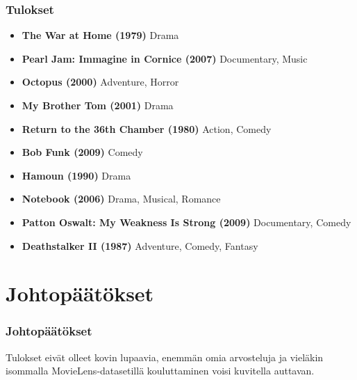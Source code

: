 \documentclass{beamer}
\begin{document}

\begin{frame}
\frametitle{Tulokset}

\begin{itemize}
	\item \textbf{The War at Home (1979)} Drama
	\item \textbf{Pearl Jam: Immagine in Cornice (2007)} Documentary, Music
	\item \textbf{Octopus (2000)} Adventure, Horror
	\item \textbf{My Brother Tom (2001)} Drama
	\item \textbf{Return to the 36th Chamber (1980)} Action, Comedy
	\item \textbf{Bob Funk (2009)} Comedy
	\item \textbf{Hamoun (1990)} Drama
	\item \textbf{Notebook (2006)} Drama, Musical, Romance
	\item \textbf{Patton Oswalt: My Weakness Is Strong (2009)} Documentary, Comedy
	\item \textbf{Deathstalker II (1987)} Adventure, Comedy, Fantasy
\end{itemize}

\end{frame}


\section{Johtopäätökset}

\begin{frame}
\frametitle{Johtopäätökset}

Tulokset eivät olleet kovin lupaavia, enemmän omia arvosteluja ja vieläkin isommalla MovieLens-datasetillä kouluttaminen voisi kuvitella auttavan.

\end{frame}

\end{document}
